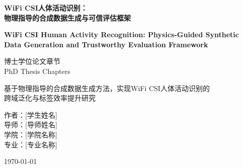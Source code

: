 \documentclass[12pt,a4paper,oneside]{book}
\begin{document}
\pagestyle{fancy}
\fancyhf{}
\fancyhead[L]{\leftmark}
\fancyhead[R]{\thepage}
\renewcommand{\headrulewidth}{0.4pt}

\onehalfspacing

\begin{titlepage}
\centering
\vspace*{2cm}

{\Huge\bfseries WiFi CSI人体活动识别：\\物理指导的合成数据生成与可信评估框架}

\vspace{1cm}

{\Large\bfseries WiFi CSI Human Activity Recognition: Physics-Guided Synthetic Data Generation and Trustworthy Evaluation Framework}

\vspace{2cm}

{\large 
博士学位论文章节\\
PhD Thesis Chapters
}

\vspace{2cm}

{\large
基于物理指导的合成数据生成方法，实现WiFi CSI人体活动识别的\\
跨域泛化与标签效率提升研究
}

\vspace{2cm}

{\large 
作者：[学生姓名]\\
导师：[导师姓名]\\
学院：[学院名称]\\
专业：[专业名称]
}

\vspace{2cm}

{\large \today}

\end{titlepage}

\tableofcontents
\newpage

\listoffigures
\listoftables
\newpage

\printglossary[type=\acronymtype,title=缩略词表]
\newpage





\appendix






\end{document}
